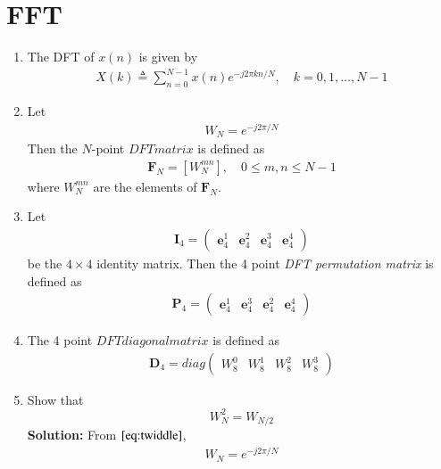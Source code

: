 \documentclass[journal,12pt,twocolumn]{IEEEtran}
\newcommand{\solution}{\noindent \textbf{Solution: }}
\providecommand{\sbrak}[1]{\ensuremath{\left[#1\right]}}
\let\vec\mathbf
\numberwithin{equation}{section}
\renewcommand\thesection{\arabic{section}}
\newcommand{\myvec}[1]{\ensuremath{\begin{pmatrix}#1\end{pmatrix}}}
\begin{document}
\section{FFT}
\begin{enumerate}[label=\arabic*.,ref=\thesection.\theenumi]
    \item The DFT of $x(n)$ is given by
    \begin{align}
        X(k) \triangleq \sum_{n=0}^{N-1} x(n) e^{-j 2 \pi k n / N}, \quad k=0,1, \ldots, N-1 \label{def:DFT}
    \end{align}
\item Let 
	\begin{align}
W_{N} = e^{-j2\pi/N} \label{eq:twiddle}
	\end{align}
		Then the $N$-point ${ DFT matrix}$ is defined as 
	\begin{align}
		\vec{F}_{N} = \sbrak{W_{N}^{mn}}, \quad 0 \le m,n \le N-1 \label{def:N-point_matrix} 
	\end{align}
	where $W_{N}^{mn}$ are the elements of $\vec{F}_{N}$.
\item Let 
	\begin{align}
		\vec{I}_4 = \myvec{\vec{e}_4^{1} &\vec{e}_4^{2} &\vec{e}_4^{3} &\vec{e}_4^{4} }
	\end{align}
		be the $4\times 4$ identity matrix.  Then the 4 point {\em DFT permutation matrix} is defined as 
	\begin{align}
		\vec{P}_4 = \myvec{\vec{e}_4^{1} &\vec{e}_4^{3} &\vec{e}_4^{2} &\vec{e}_4^{4} } \label{elem_mat}
	\end{align}
\item The 4 point ${ DFT diagonal matrix}$ is defined as 
	\begin{align}
		\vec{D}_4 = diag\myvec{W_{8}^{0} & W_{8}^{1} & W_{8}^{2} & W_{8}^{3}} \label{def-diagonal_matrix}
	\end{align}
\item Show that 
\begin{equation}
    W_{N}^{2}=W_{N/2}
\end{equation}
\solution 
	From $\eqref{eq:twiddle}$,
		\begin{align}
			W_{N} = e^{-j2\pi/N}

\end{align}
\end{enumerate}
\end{document}

